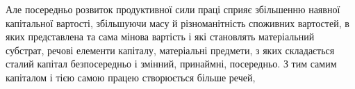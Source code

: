 Але посередньо розвиток продуктивної сили праці сприяє
збільшенню наявної капітальної вартості, збільшуючи масу й різноманітність
споживних вартостей, в яких представлена та сама
мінова вартість і які становлять матеріальний субстрат, речові елементи
капіталу, матеріальні предмети, з яких складається сталий
капітал безпосередньо і змінний, принаймні, посередньо. З тим
самим капіталом і тією самою працею створюється більше речей,
\parbreak{}  %
